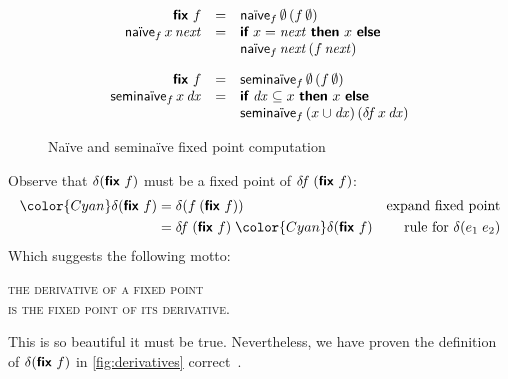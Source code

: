 \documentclass[sigplan,screen,review,timestamp,dvipsnames]{acmart}
\newcommand{\hilited}{\color{Cyan}}
\newcommand{\naive}{na\"ive}
\renewcommand{\d}{\delta}
\newcommand{\kw}[1]{\textsf{\bfseries #1}}
\newcommand{\tlv}[1]{\textsf{#1}}
\newcommand{\var}[1]{\mathit{#1}}
\newcommand{\dee}[1]{\var{d#1}}
\newcommand{\efix}{\kw{fix}~}
\begin{document}
\begin{figure}
  \[
  \begin{array}{rcl}
  \efix f &=& \tlv{\naive}_f \,\emptyset \,(f\, \emptyset)\\
  \tlv{\naive}_f \,x \,\var{next}
  &=& \kw{if}~ x = \var{next} ~\kw{then}~ x ~\kw{else}\\
  && \tlv{\naive}_f \,\var{next} \,(f \,\var{next})

  \vspace{1em}\\

  \efix f &=& \tlv{semi\naive}_f \,\emptyset \,(f\, \emptyset)\\
  \tlv{semi\naive}_f \,x \,\dee x
  &=& \kw{if}~ \dee x \subseteq x ~\kw{then}~ x ~\kw{else}\\
  && \tlv{semi\naive}_f \,(x \cup \dee x) \,(\d\!f \,x \,\dee x)
  \end{array}
  \]
  \vspace{-.5em}
  \caption{Na\"ive and semina\"ive fixed point computation}
  \label{fig:defining-fix}
\end{figure}

\vspace{1em}

Observe that $\d(\efix f)$ must be a fixed point of $\d\!f\;(\efix f)$:
%
\begin{align*}
  {\hilited \d(\efix f)}
  &= \d(f\: (\efix f))
  & \text{expand fixed point}\\
  &= \d\!f\; (\efix f)\; {\hilited \d(\efix f)}
  & \text{rule for}~\delta(e_1\;e_2)
\end{align*}
%
Which suggests the following motto:
\begin{center}
  \large \scshape
  the derivative of a fixed point\nopagebreak\\
  is the fixed point of its derivative.
\end{center}
%
This is so beautiful it must be true. Nevertheless, we have proven the definition of $\delta(\efix f)$ in \cref{fig:derivatives} correct~\citep{fixderiv}.





\end{document}
